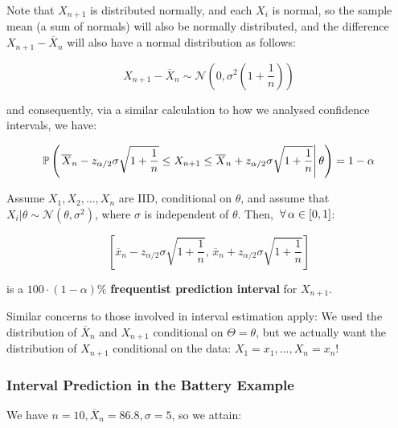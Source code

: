 \documentclass[a4paper]{article}
\begin{document}
            Note that $X_{n + 1}$ is distributed normally, and each $X_i$ is
            normal, so the sample mean (a sum of normals) will also be normally
            distributed, and the difference $X_{n + 1} - \overline X_n$ will
            also have a normal distribution as follows:

            \[
                X_{n + 1} - \overline X_n \sim \mathcal{N}\left(0,
                \sigma^2\left(1 + \frac{1}{n}\right)\right)
            \]

            and consequently, via a similar calculation to how we analysed
            confidence intervals, we have:

            \[
                \mathbb{P}\left(\left.\overline X_n - z_{\alpha/2} \sigma\sqrt{1 +
                \frac{1}{n}} \leq X_{n + 1} \leq \overline X_{n} + z_{\alpha/2}
                \sigma\sqrt{1 + \frac{1}{n}} \right| \theta\right) = 1 - \alpha
            \]

            \begin{definition}
                Assume $X_1, X_2, ..., X_n$ are IID, conditional on $\theta$,
                and assume that $X_i | \theta \sim \mathcal{N} (\theta,
                \sigma^2)$, where $\sigma$ is independent of $\theta$. Then,
                $\,\forall\, \alpha \in [0, 1]$:

                \[
                    \left[\overline x_n - z_{\alpha/2}\sigma\sqrt{1 +
                    \frac{1}{n}}, \,\overline x_n + z_{\alpha/2} \sigma\sqrt{1 +
                    \frac{1}{n}}\right]
                \]

                is a $100 \cdot (1 - \alpha)\%$ \textbf{frequentist prediction
                interval} for $X_{n + 1}$.
            \end{definition}

            \begin{warn}
                Similar concerns to those involved in interval estimation apply:
                We used the distribution of $\overline X_n$ and $X_{n + 1}$
                conditional on $\Theta = \theta$, but we actually want the
                distribution of $X_{n + 1}$ conditional on the data: $X_1 = x_1,
                ..., X_n = x_n$!
            \end{warn}

            \subsubsection{Interval Prediction in the Battery Example}
                We have $n = 10, \overline X_n = 86.8, \sigma = 5$, so we
                attain:
\end{document}
